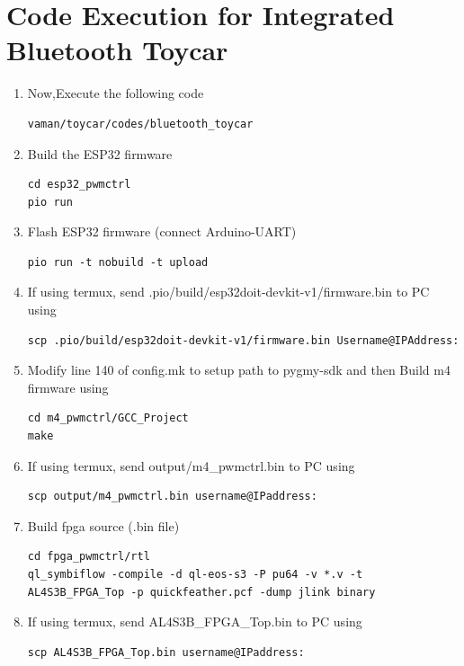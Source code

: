 \section{Code Execution for Integrated Bluetooth Toycar}
\begin{enumerate}[label=\thesection.\arabic*.,ref=\thesection.\theenumi]

\item Now,Execute the following code 

\begin{lstlisting}
vaman/toycar/codes/bluetooth_toycar
\end{lstlisting}

\item Build the ESP32 firmware
\begin{lstlisting}
cd esp32_pwmctrl
pio run
\end{lstlisting} 

\item Flash ESP32 firmware (connect Arduino-UART)
\begin{lstlisting}
pio run -t nobuild -t upload
\end{lstlisting} 

\item If using termux, send .pio/build/esp32doit-devkit-v1/firmware.bin to PC using
\begin{lstlisting}
scp .pio/build/esp32doit-devkit-v1/firmware.bin Username@IPAddress:
\end{lstlisting} 

\item  Modify line 140 of config.mk to setup path to pygmy-sdk and then Build m4 firmware using
\begin{lstlisting}
cd m4_pwmctrl/GCC_Project
make
\end{lstlisting}

\item If using termux, send output/m4{\_}pwmctrl.bin to PC using
\begin{lstlisting}
scp output/m4_pwmctrl.bin username@IPaddress:
\end{lstlisting} 

\item Build fpga source (.bin file)
\begin{lstlisting}
cd fpga_pwmctrl/rtl
ql_symbiflow -compile -d ql-eos-s3 -P pu64 -v *.v -t AL4S3B_FPGA_Top -p quickfeather.pcf -dump jlink binary 
\end{lstlisting} 

\item If using termux, send AL4S3B{\_}FPGA{\_}Top.bin to PC using
\begin{lstlisting}
scp AL4S3B_FPGA_Top.bin username@IPaddress:
\end{lstlisting} 


\end{enumerate}
